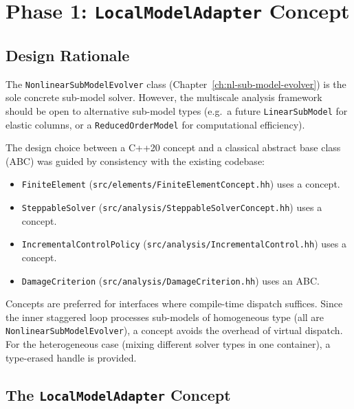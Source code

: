 \section{Phase 1: \texttt{LocalModelAdapter} Concept}
\label{sec:refactor-local-model}

\subsection{Design Rationale}
\label{sec:refactor-local-model-rationale}

The \texttt{NonlinearSubModelEvolver} class
(Chapter~\ref{ch:nl-sub-model-evolver}) is the sole concrete
sub-model solver.  However, the multiscale analysis framework should
be open to alternative sub-model types (e.g.\ a future
\texttt{LinearSubModel} for elastic columns, or a
\texttt{ReducedOrderModel} for computational efficiency).

The design choice between a C++20 concept and a classical abstract
base class (ABC) was guided by consistency with the existing
codebase:

\begin{itemize}
  \item \texttt{FiniteElement}
    (\texttt{src/elements/FiniteElementConcept.hh}) uses a concept.
  \item \texttt{SteppableSolver}
    (\texttt{src/analysis/SteppableSolverConcept.hh}) uses a concept.
  \item \texttt{IncrementalControlPolicy}
    (\texttt{src/analysis/IncrementalControl.hh}) uses a concept.
  \item \texttt{DamageCriterion}
    (\texttt{src/analysis/DamageCriterion.hh}) uses an ABC.
\end{itemize}

Concepts are preferred for interfaces where compile-time dispatch
suffices.  Since the inner staggered loop processes sub-models of
homogeneous type (all are \texttt{NonlinearSubModelEvolver}), a
concept avoids the overhead of virtual dispatch.  For the
heterogeneous case (mixing different solver types in one container),
a type-erased handle is provided.

\subsection{The \texttt{LocalModelAdapter} Concept}
\label{sec:refactor-concept-def}

